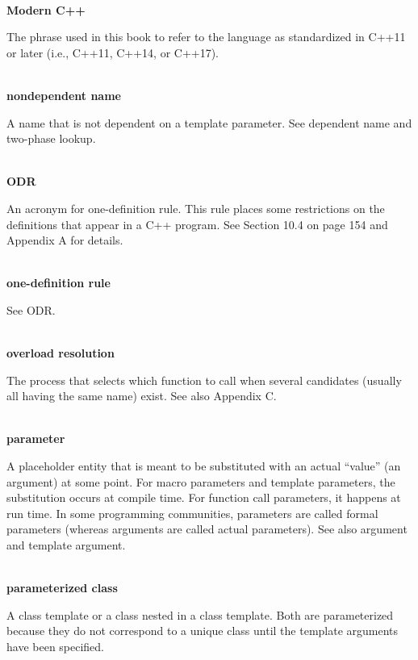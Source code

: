 \hspace*{\fill} \\ %
\noindent
\textbf{Modern C++}

The phrase used in this book to refer to the language as standardized in C++11 or later (i.e., C++11, C++14, or C++17).

\hspace*{\fill} \\ %
\noindent
\textbf{nondependent name}

A name that is not dependent on a template parameter. See dependent name and two-phase lookup.

\hspace*{\fill} \\ %
\noindent
\textbf{ODR}

An acronym for one-definition rule. This rule places some restrictions on the definitions that appear in a C++ program. See Section 10.4 on page 154 and Appendix A for details.

\hspace*{\fill} \\ %
\noindent
\textbf{one-definition rule}

See ODR.

\hspace*{\fill} \\ %
\noindent
\textbf{overload resolution}

The process that selects which function to call when several candidates (usually all having the same name) exist. See also Appendix C.

\hspace*{\fill} \\ %
\noindent
\textbf{parameter}

A placeholder entity that is meant to be substituted with an actual “value” (an argument) at some point. For macro parameters and template parameters, the substitution occurs at compile time. For function call parameters, it happens at run time. In some programming communities, parameters are called formal parameters (whereas arguments are called actual parameters). See also argument and template argument.

\hspace*{\fill} \\ %
\noindent
\textbf{parameterized class}

A class template or a class nested in a class template. Both are parameterized because they do not correspond to a unique class until the template arguments have been specified.

